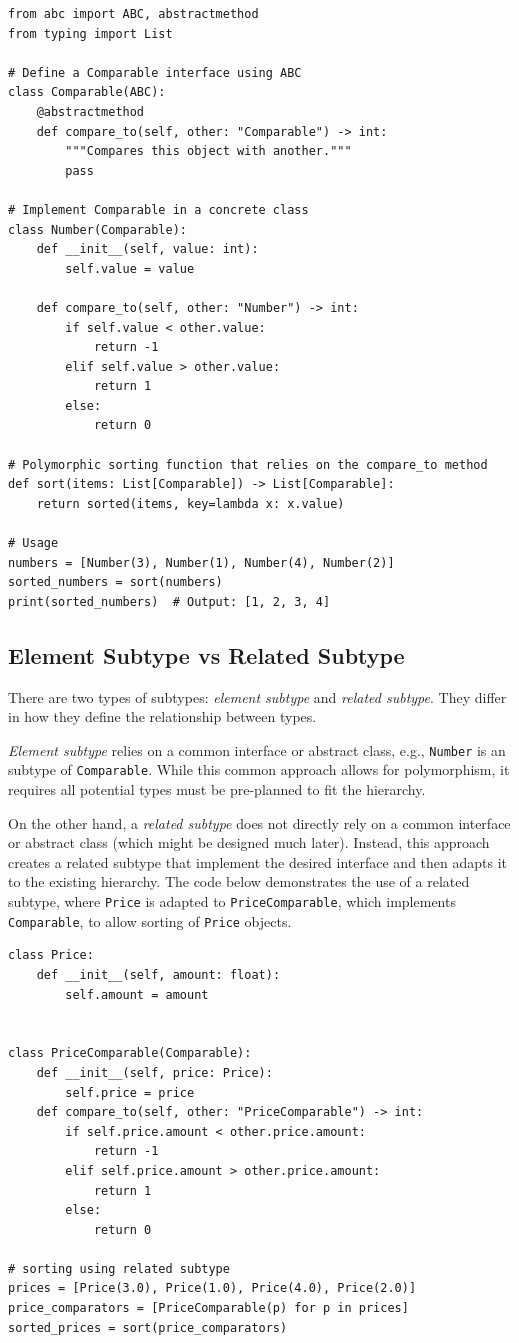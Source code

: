 \documentclass[oneside,11pt,dvipsnames]{book}
\newcommand{\code}[1]{\texttt{#1}}
\begin{document}
\begin{lstlisting}
from abc import ABC, abstractmethod
from typing import List

# Define a Comparable interface using ABC
class Comparable(ABC):
    @abstractmethod
    def compare_to(self, other: "Comparable") -> int:
        """Compares this object with another."""
        pass

# Implement Comparable in a concrete class
class Number(Comparable):
    def __init__(self, value: int):
        self.value = value

    def compare_to(self, other: "Number") -> int:
        if self.value < other.value:
            return -1
        elif self.value > other.value:
            return 1
        else:
            return 0

# Polymorphic sorting function that relies on the compare_to method
def sort(items: List[Comparable]) -> List[Comparable]:
    return sorted(items, key=lambda x: x.value)

# Usage
numbers = [Number(3), Number(1), Number(4), Number(2)]
sorted_numbers = sort(numbers)
print(sorted_numbers)  # Output: [1, 2, 3, 4]
\end{lstlisting}    

\subsection{Element Subtype vs Related Subtype} There are two types of subtypes: \emph{element subtype} and \emph{related subtype}. They differ in how they define the relationship between types.

\emph{Element subtype} relies on a common interface or abstract class, e.g., \code{Number} is an  subtype of \code{Comparable}. While this common approach allows for polymorphism, it requires all potential types must be pre-planned to fit the hierarchy. 

On the other hand, a \emph{related subtype} does not directly rely on a common interface or abstract class (which might be designed much later). Instead, this approach creates a related subtype that implement the desired interface and then adapts it to the existing hierarchy. The code below demonstrates the use of a related subtype, where \code{Price} is adapted to \code{PriceComparable}, which implements \code{Comparable}, to allow sorting of \code{Price} objects.

\begin{lstlisting}
class Price:
    def __init__(self, amount: float):
        self.amount = amount


class PriceComparable(Comparable):
    def __init__(self, price: Price):
        self.price = price
    def compare_to(self, other: "PriceComparable") -> int:
        if self.price.amount < other.price.amount:
            return -1
        elif self.price.amount > other.price.amount:
            return 1
        else:
            return 0

# sorting using related subtype            
prices = [Price(3.0), Price(1.0), Price(4.0), Price(2.0)]
price_comparators = [PriceComparable(p) for p in prices]
sorted_prices = sort(price_comparators)
\end{lstlisting}
\end{document}
